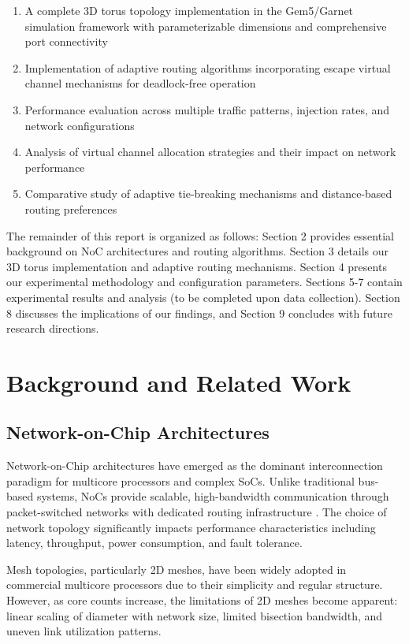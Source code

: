 \documentclass[a4paper,12pt]{article}
\begin{document}
\begin{enumerate}
    \item A complete 3D torus topology implementation in the Gem5/Garnet simulation framework with parameterizable dimensions and comprehensive port connectivity
    \item Implementation of adaptive routing algorithms incorporating escape virtual channel mechanisms for deadlock-free operation
    \item Performance evaluation across multiple traffic patterns, injection rates, and network configurations
    \item Analysis of virtual channel allocation strategies and their impact on network performance
    \item Comparative study of adaptive tie-breaking mechanisms and distance-based routing preferences
\end{enumerate}

The remainder of this report is organized as follows: Section 2 provides essential background on NoC architectures and routing algorithms. Section 3 details our 3D torus implementation and adaptive routing mechanisms. Section 4 presents our experimental methodology and configuration parameters. Sections 5-7 contain experimental results and analysis (to be completed upon data collection). Section 8 discusses the implications of our findings, and Section 9 concludes with future research directions.

\section{Background and Related Work}

\subsection{Network-on-Chip Architectures}

Network-on-Chip architectures have emerged as the dominant interconnection paradigm for multicore processors and complex SoCs. Unlike traditional bus-based systems, NoCs provide scalable, high-bandwidth communication through packet-switched networks with dedicated routing infrastructure \cite{benini2002networks}. The choice of network topology significantly impacts performance characteristics including latency, throughput, power consumption, and fault tolerance.

Mesh topologies, particularly 2D meshes, have been widely adopted in commercial multicore processors due to their simplicity and regular structure. However, as core counts increase, the limitations of 2D meshes become apparent: linear scaling of diameter with network size, limited bisection bandwidth, and uneven link utilization patterns.
\end{document}
